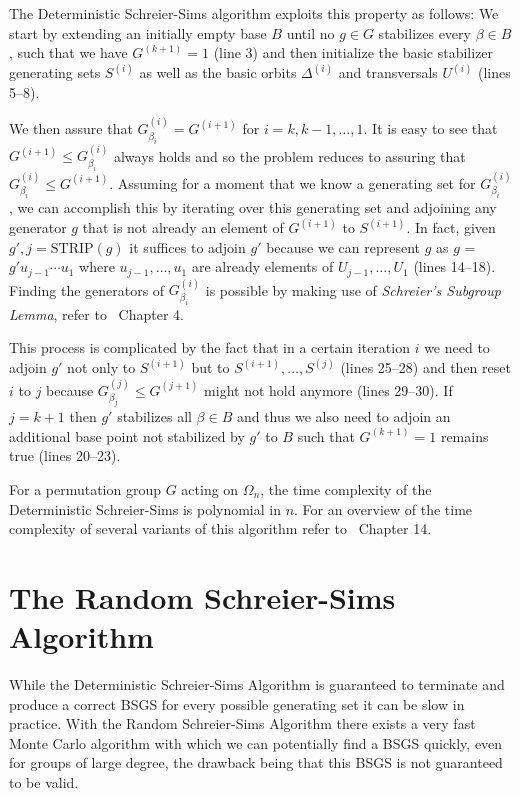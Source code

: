 The Deterministic Schreier-Sims algorithm exploits this property as follows:
%
We start by extending an initially empty base $B$ until no $g \in G$ stabilizes
every $\beta \in B$, such that we have $G^{(k+1)} = 1$ (line 3) and then
initialize the basic stabilizer generating sets $S^{(i)}$ as well as the basic
orbits $\Delta^{(i)}$ and transversals $U^{(i)}$ (lines 5--8).

We then assure that $G^{(i)}_{\beta_i} = G^{(i + 1)}$ for $i = k, k-1, \dots,
1$. It is easy to see that $G^{(i + 1)} \leq G^{(i)}_{\beta_i}$ always holds
and so the problem reduces to assuring that $G^{(i)}_{\beta_i} \leq G^{(i +
1)}$.
%
Assuming for a moment that we know a generating set for $G^{(i)}_{\beta_i}$, we
can accomplish this by iterating over this generating set and adjoining any
generator $g$ that is not already an element of $G^{(i + 1)}$ to $S^{(i + 1)}$.
In fact, given $g', j = \mathrm{STRIP}(g)$ it suffices to adjoin $g'$ because
we can represent $g$ as $g$ = $g' u_{j-1} \cdots u_1$ where $u_{j-1}, \dots,
u_1$ are already elements of $U_{j-1}, \dots, U_1$ (lines 14--18).
%
Finding the generators of $G^{(i)}_{\beta_i}$ is possible by making use of
\textit{Schreier's Subgroup Lemma}, refer to~\cite{Holt} Chapter 4.

This process is complicated by the fact that in a certain iteration $i$ we need
to adjoin $g'$ not only to $S^{(i + 1)}$ but to $S^{(i + 1)}, \dots, S^{(j)}$
(lines 25--28) and then reset $i$ to $j$ because $G^{(j)}_{\beta_j} \leq G^{(j +
1)}$ might not hold anymore (lines 29--30).
%
If $j = k + 1$ then $g'$ stabilizes all $\beta \in B$ and thus we also need to
adjoin an additional base point not stabilized by $g'$ to $B$ such that $G^{(k
+ 1)} = 1$ remains true (lines 20--23).

For a permutation group $G$ acting on $\Omega_n$, the time complexity of the
Deterministic Schreier-Sims is polynomial in $n$. For an overview of the time
complexity of several variants of this algorithm refer to~\cite{Butler}
Chapter 14.

\section{The Random Schreier-Sims Algorithm}
\label{sec:bsgs_the_random_schreier_sims_algorithm}

While the Deterministic Schreier-Sims Algorithm is guaranteed to terminate and
produce a correct BSGS for every possible generating set it can be slow in
practice. With the Random Schreier-Sims Algorithm there exists a very fast
Monte Carlo algorithm with which we can potentially find a BSGS quickly,
even for groups of large degree, the drawback being that this BSGS is not
guaranteed to be valid.

